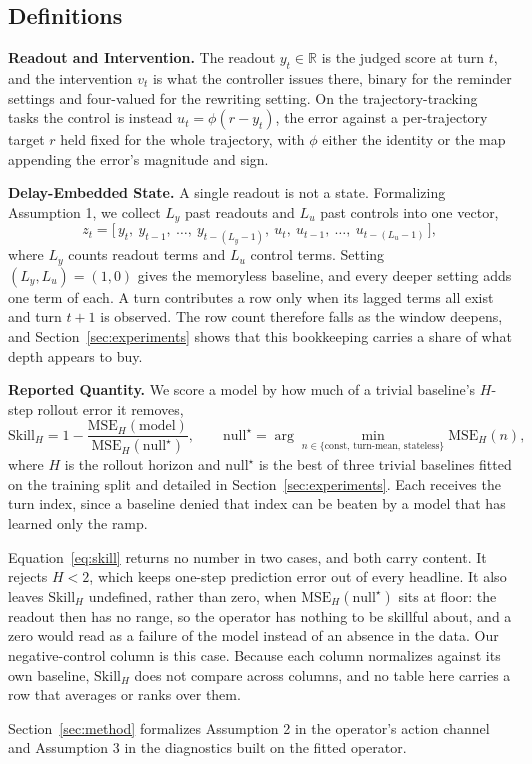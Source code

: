 \subsection*{Definitions}

\textbf{Readout and Intervention.} The readout $y_t \in \mathbb{R}$ is the judged score at turn
$t$, and the intervention $v_t$ is what the controller issues there, binary for the reminder
settings and four-valued for the rewriting setting. On the trajectory-tracking tasks the control
is instead $u_t = \phi(r - y_t)$, the error against a per-trajectory target $r$ held fixed for
the whole trajectory, with $\phi$ either the identity or the map appending the error's magnitude
and sign.

\textbf{Delay-Embedded State.} A single readout is not a state. Formalizing Assumption 1, we
collect $L_y$ past readouts and $L_u$ past controls into one vector,
%
\begin{equation}
  z_t = \bigl[\,y_t,\ y_{t-1},\ \dots,\ y_{t-(L_y-1)},\ u_t,\ u_{t-1},\ \dots,\ u_{t-(L_u-1)}\,\bigr],
  \label{eq:delay-state}
\end{equation}
%
where $L_y$ counts readout terms and $L_u$ control terms. Setting $(L_y, L_u) = (1,0)$ gives the
memoryless baseline, and every deeper setting adds one term of each. A turn contributes a row
only when its lagged terms all exist and turn $t+1$ is observed. The row count therefore falls
as the window deepens, and Section~\ref{sec:experiments} shows that this bookkeeping carries a
share of what depth appears to buy.

\textbf{Reported Quantity.} We score a model by how much of a trivial baseline's $H$-step rollout
error it removes,
%
\begin{equation}
  \mathrm{Skill}_H = 1 - \frac{\mathrm{MSE}_H(\text{model})}{\mathrm{MSE}_H(\text{null}^\star)},
  \qquad
  \text{null}^\star = \arg\min_{n \in \{\text{const},\, \text{turn-mean},\, \text{stateless}\}} \mathrm{MSE}_H(n),
  \label{eq:skill}
\end{equation}
%
where $H$ is the rollout horizon and $\text{null}^\star$ is the best of three trivial baselines
fitted on the training split and detailed in Section~\ref{sec:experiments}. Each receives the turn
index, since a baseline denied that index can be beaten by a model that has learned only the ramp.

Equation~\eqref{eq:skill} returns no number in two cases, and both carry content. It rejects
$H < 2$, which keeps one-step prediction error out of every headline. It also leaves
$\mathrm{Skill}_H$ undefined, rather than zero, when $\mathrm{MSE}_H(\text{null}^\star)$ sits at
floor: the readout then has no range, so the operator has nothing to be skillful about, and a
zero would read as a failure of the model instead of an absence in the data. Our negative-control
column is this case. Because each column normalizes against its own baseline, $\mathrm{Skill}_H$
does not compare across columns, and no table here carries a row that averages or ranks over them.

Section~\ref{sec:method} formalizes Assumption 2 in the operator's action channel and
Assumption 3 in the diagnostics built on the fitted operator.
